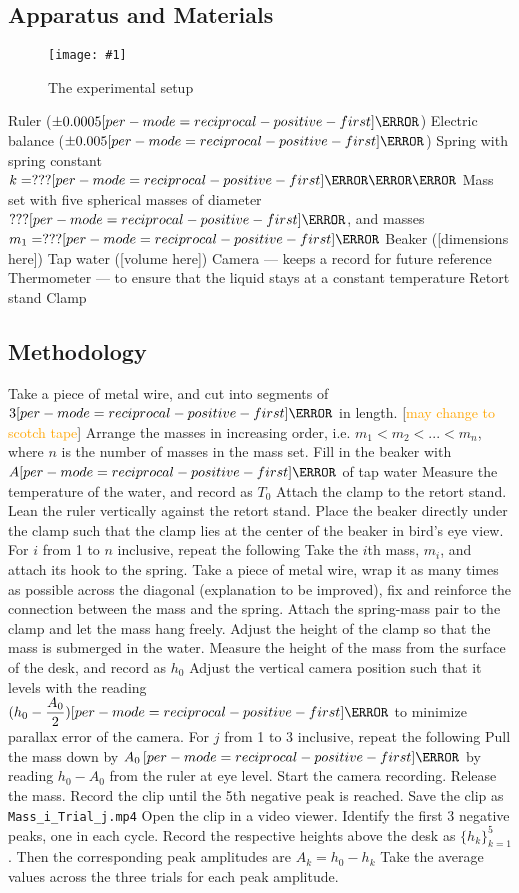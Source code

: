 \documentclass[a4paper,12pt]{article}
\let\oldsi\si
\renewcommand{\si}[1]{\oldsi[per-mode=reciprocal-positive-first]{#1}}
\newcommand{\img}[4]{\begin{center}
  \begin{figure}[H]
    \centering
    \texttt{[image: \#1]}
    \caption{#3}
    \label{fig:#4}
  \end{figure}
\end{center}}
\begin{document}
\subsection{Apparatus and Materials}
\img{figs/setup.png}{0.8}{The experimental setup}{setup}
\begin{outline}[enumerate]
  \1 Ruler ($\pm 0.0005\si{\m}$)
  \1 Electric balance ($\pm 0.005\si{\g}$)
  \1 Spring with spring constant $k = ???\si{\N\per\m}$
  \1 Mass set with five spherical masses of diameter $???\si{\cm}$, and masses
  \2 $m_1 = ???\si{\g}$
  \1 Beaker ([dimensions here])
  \1 Tap water ([volume here])
  \1 Camera --- keeps a record for future reference
  \1 Thermometer --- to ensure that the liquid stays at a constant temperature
  \1 Retort stand
  \1 Clamp
\end{outline}

\subsection{Methodology}

\begin{outline}[enumerate]
  \1 Take a piece of metal wire, and cut into segments of $3\si{\cm}$ in length. [\textcolor{orange}{may change to scotch tape}]
  \1 Arrange the masses in increasing order, i.e. $m_1 < m_2 < ... < m_n$, where $n$ is the number of masses in the mass set.
  \1 Fill in the beaker with $A\si{\mL}$ of tap water
  \1 Measure the temperature of the water, and record as $T_0$
  \1 Attach the clamp to the retort stand.
  \1 Lean the ruler vertically against the retort stand.
  \1 Place the beaker directly under the clamp such that the clamp lies at the center of the beaker in bird's eye view.
  \1 For $i$ from 1 to $n$ inclusive, repeat the following
  \2 Take the $i$th mass, $m_i$, and attach its hook to the spring.
  \2 Take a piece of metal wire, wrap it as many times as possible across the diagonal (explanation to be improved), fix and reinforce the connection between the mass and the spring.
  \2 Attach the spring-mass pair to the clamp and let the mass hang freely.
  \2 Adjust the height of the clamp so that the mass is submerged in the water.
  \2 Measure the height of the mass from the surface of the desk, and record as $h_0$
  \2 Adjust the vertical camera position such that it levels with the reading $(h_0 - \dfrac{A_0}{2}) \si{\cm}$ to minimize parallax error of the camera.
  \2 For $j$ from 1 to 3 inclusive, repeat the following
  \3 Pull the mass down by $A_0\,\si{\cm}$ by reading $h_0 - A_0$ from the ruler at eye level.
  \3 Start the camera recording.
  \3 Release the mass.
  \3 Record the clip until the 5th negative peak is reached.
  \3 Save the clip as \verb|Mass_i_Trial_j.mp4|
  \3 Open the clip in a video viewer.
  \3 Identify the first 3 negative peaks, one in each cycle.
  \3 Record the respective heights above the desk as $\{h_k\}^{5}_{k=1}$.
  \3 Then the corresponding peak amplitudes are $A_k = h_0 - h_{k}$
  \2 Take the average values across the three trials for each peak amplitude.
\end{outline}
\end{document}
